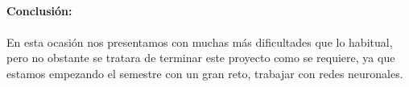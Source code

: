 \documentclass[40pt]{article}
\begin{document}
\maketitle
\textsf{\ \\
\textbf{Conclusión:}
\\
\\
En esta ocasión nos presentamos con muchas más dificultades que lo habitual, pero no obstante se tratara de terminar este proyecto como se requiere, ya que estamos empezando el semestre con un gran reto, trabajar con redes neuronales.\\}
\end{document}
